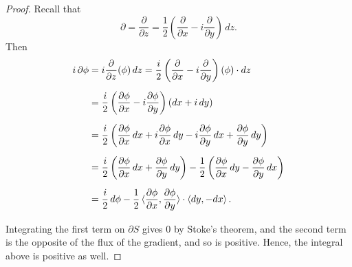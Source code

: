 \documentclass[11pt,oneside,english]{amsart}
\theoremstyle{definition}
\newcommand{\pp}[2]{\frac{\partial{#1}}{\partial{#2}}}
\def\<#1>{\mathinner{\langle#1\rangle}}
\begin{document}
\begin{enumerate}[leftmargin=*]
\begin{proof}
Recall that
\[
\partial=\pp{}{z}=\frac{1}{2}\left(\pp{}{x}-i\pp{}{y}\right)\,dz.
\]
Then
\begin{align*}
i\,\partial\phi&=i\pp{}{z}(\phi)\,dz=\frac{i}{2}\left(\pp{}{x}-i\pp{}{y}\right)(\phi)\cdot dz\\[2mm]
&=\frac{i}{2}\left(\pp{\phi}{x}-i\pp{\phi}{y}\right)(dx+i\,dy)\\[2mm]
&=\frac{i}{2}\left(\pp{\phi}{x}\,dx+i\pp{\phi}{x}\,dy-i\pp{\phi}{y}\,dx+\pp{\phi}{y}\,dy\right)\\[2mm]
&=\frac{i}{2}\left(\pp{\phi}{x}\,dx+\pp{\phi}{y}\,dy\right)-\frac{1}{2}\left(\pp{\phi}{x}\,dy-\pp{\phi}{y}\,dx\right)\\[2mm]
&=\frac{i}{2}\,d\phi-\frac{1}{2}\<\pp{\phi}{x},\pp{\phi}{y}>\cdot\<dy,-dx>.\\[2mm]
\end{align*}
Integrating the first term on $\partial S$ gives 0 by Stoke's theorem, and the second term is the opposite of the flux of the gradient, and so is positive. Hence, the integral above is positive as well.
\end{proof}


\end{enumerate}
\end{document}
